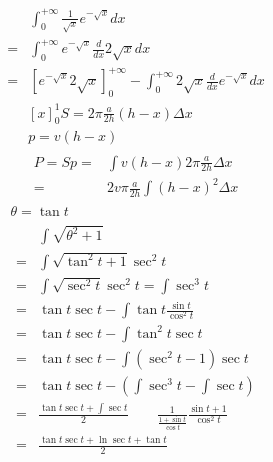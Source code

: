 \documentclass{article}
\begin{document}
  \begin{align*}
    & \int_{0}^{+\infty} \frac{1}{\sqrt{x}}e^{-\sqrt{x}} dx \\
    =& \int_{0}^{+\infty} e^{-\sqrt{x}}\frac{d}{dx}2\sqrt{x} dx \\
    =& \left[e^{-\sqrt{x}}2\sqrt{x}\right]_{0}^{+\infty} - \int_{0}^{+\infty}2 \sqrt{x}\frac{d}{dx}e^{-\sqrt{x}} dx
  \end{align*}
  \begin{gather*}
    \left[x\right]^{1}_{0}
    S = 2\pi\frac{a}{2h}(h - x)\Delta{x}\\
    p = v(h - x)\\
    \begin{aligned}
      P = Sp =& \int v(h - x)2\pi\frac{a}{2h}\Delta{x} \\
      =&2v\pi\frac{a}{2h}\int (h - x)^{2} \Delta{x}
    \end{aligned}
  \end{gather*}
  \begin{gather*}
    \theta = \tan{t} \\
    \begin{aligned}
      & \int \sqrt{\theta^{2} + 1} \\
      =& \int \sqrt{\tan^{2}{t} + 1} \sec^{2}{t} \\
      =& \int \sqrt{\sec^{2}{t}} \sec^{2}{t} = \int \sec^{3}{t} \\
      =& \tan{t}\sec{t} - \int \tan{t}\frac{\sin{t}}{\cos^{2}{t}} \\
      =& \tan{t}\sec{t} - \int \tan^{2}{t}\sec{t} \\
      =& \tan{t}\sec{t} - \int (\sec^{2}{t} - 1)\sec{t} \\
      =& \tan{t}\sec{t} - ( \int \sec^{3}{t} - \int \sec{t} ) \\
      =& \frac{\tan{t}\sec{t} + \int \sec{t}}{2} \qquad \frac{1}{\frac{1 + \sin{t}}{\cos{t}}}\frac{\sin{t} + 1}{\cos^{2}{t}} \\
      =& \frac{\tan{t}\sec{t} + \ln{\sec{t} + \tan{t}}}{2}
    \end{aligned}
  \end{gather*}
\end{document}
